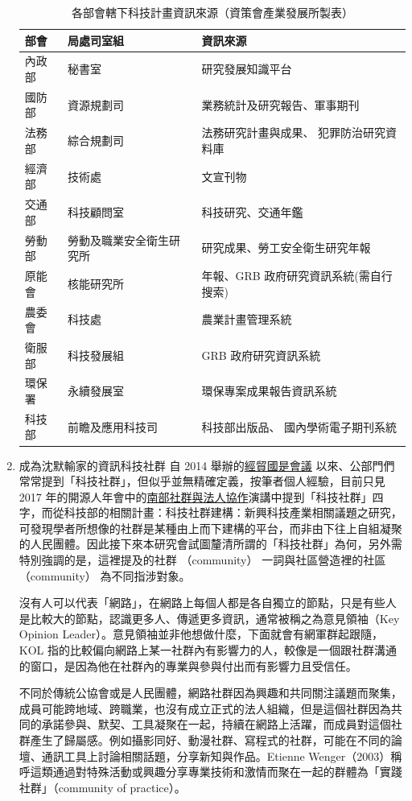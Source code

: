 \documentclass[12pt,a4paper]{article}
\begin{document}
\begin{enumerate}
\begin{table}[htbp]
\caption{\label{tab:org6878d0a}
各部會轄下科技計畫資訊來源（資策會產業發展所製表）}
\centering
\begin{tabular}{lll}
\toprule
部會 & 局處司室組 & 資訊來源\\
\midrule
內政部 & 秘書室 & 研究發展知識平台\\
國防部 & 資源規劃司 & 業務統計及研究報告、軍事期刊\\
法務部 & 綜合規劃司 & 法務研究計畫與成果、 犯罪防治研究資料庫\\
經濟部 & 技術處 & 文宣刊物\\
交通部 & 科技顧問室 & 科技研究、交通年鑑\\
勞動部 & 勞動及職業安全衛生研究所 & 研究成果、勞工安全衛生研究年報\\
原能會 & 核能研究所 & 年報、GRB 政府研究資訊系統(需自行搜索)\\
農委會 & 科技處 & 農業計畫管理系統\\
衛服部 & 科技發展組 & GRB 政府研究資訊系統\\
環保署 & 永續發展室 & 環保專案成果報告資訊系統\\
科技部 & 前瞻及應用科技司 & 科技部出版品、 國內學術電子期刊系統\\
\bottomrule
\end{tabular}
\end{table}
\item 成為沈默輸家的資訊科技社群
\label{sec:org17a8c2f}
自 2014 舉辦的\href{https://www.ndc.gov.tw/Content\_List.aspx?n=F6A29549FD03E057}{經貿國是會議} 以來、公部門們常常提到「科技社群」，但似乎並無精確定義，按筆者個人經驗，目前只見 2017 年的開源人年會中的\href{https://www.youtube.com/watch?v=mrMsNItdkNs}{南部社群與法人協作}演講中提到「科技社群」四字，而從科技部的相關計畫：科技社群建構：新興科技產業相關議題之研究，可發現學者所想像的社群是某種由上而下建構的平台，而非由下往上自組凝聚的人民團體。因此接下來本研究會試圖釐清所謂的「科技社群」為何，另外需特別強調的是，這裡提及的社群 （community） 一詞與社區營造裡的社區 （community） 為不同指涉對象。

沒有人可以代表「網路」，在網路上每個人都是各自獨立的節點，只是有些人是比較大的節點，認識更多人、傳遞更多資訊，通常被稱之為意見領袖（Key Opinion Leader）。意見領袖並非他想做什麼，下面就會有網軍群起跟隨，KOL 指的比較偏向網路上某一社群內有影響力的人，較像是一個跟社群溝通的窗口，是因為他在社群內的專業與參與付出而有影響力且受信任。

不同於傳統公協會或是人民團體，網路社群因為興趣和共同關注議題而聚集，成員可能跨地域、跨職業，也沒有成立正式的法人組織，但是這個社群因為共同的承諾參與、默契、工具凝聚在一起，持續在網路上活躍，而成員對這個社群產生了歸屬感。例如攝影同好、動漫社群、寫程式的社群，可能在不同的論壇、通訊工具上討論相關話題，分享新知與作品。Etienne Wenger（2003）稱呼這類通過對特殊活動或興趣分享專業技術和激情而聚在一起的群體為「實踐社群」（community of practice）。


\end{enumerate}
\end{document}
